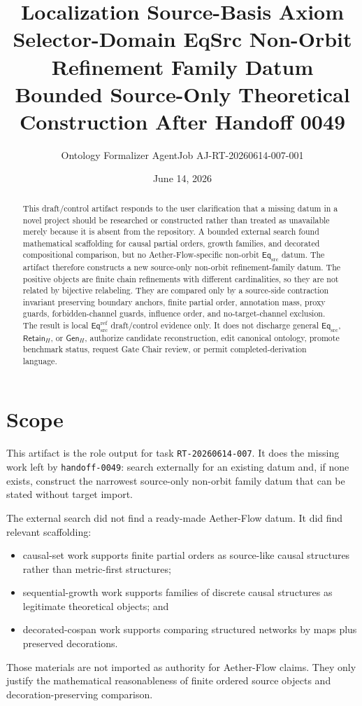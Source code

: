 \documentclass[11pt]{article}
\title{\textbf{Localization Source-Basis Axiom Selector-Domain EqSrc Non-Orbit Refinement Family Datum}\\[0.35em]
\large Bounded Source-Only Theoretical Construction After Handoff 0049}
\author{Ontology Formalizer AgentJob AJ-RT-20260614-007-001}
\date{June 14, 2026}
\newcommand{\EqSrc}{\mathsf{Eq}_{\mathrm{src}}}
\newcommand{\EqRef}{\mathsf{Eq}_{\mathrm{src}}^{\mathrm{ref}}}
\newcommand{\RetainH}{\mathsf{Retain}_{H}}
\newcommand{\GenH}{\mathsf{Gen}_{H}}
\begin{document}
\maketitle

\begin{abstract}
This draft/control artifact responds to the user clarification that a
missing datum in a novel project should be researched or constructed rather
than treated as unavailable merely because it is absent from the repository.
A bounded external search found mathematical scaffolding for causal partial
orders, growth families, and decorated compositional comparison, but no
Aether-Flow-specific non-orbit \(\EqSrc\) datum. The artifact therefore
constructs a new source-only non-orbit refinement-family datum. The positive
objects are finite chain refinements with different cardinalities, so they
are not related by bijective relabeling. They are compared only by a
source-side contraction invariant preserving boundary anchors, finite
partial order, annotation mass, proxy guards, forbidden-channel guards,
influence order, and no-target-channel exclusion. The result is local
\(\EqRef\) draft/control evidence only. It does not discharge general
\(\EqSrc\), \(\RetainH\), or \(\GenH\), authorize candidate reconstruction,
edit canonical ontology, promote benchmark status, request Gate Chair
review, or permit completed-derivation language.
\end{abstract}

\section{Scope}

This artifact is the role output for task \texttt{RT-20260614-007}. It
does the missing work left by \texttt{handoff-0049}: search externally for
an existing datum and, if none exists, construct the narrowest source-only
non-orbit family datum that can be stated without target import.

The external search did not find a ready-made Aether-Flow datum. It did
find relevant scaffolding:
\begin{itemize}
    \item causal-set work supports finite partial orders as source-like
    causal structures rather than metric-first structures;
    \item sequential-growth work supports families of discrete causal
    structures as legitimate theoretical objects; and
    \item decorated-cospan work supports comparing structured networks by
    maps plus preserved decorations.
\end{itemize}
Those materials are not imported as authority for Aether-Flow claims. They
only justify the mathematical reasonableness of finite ordered source
objects and decoration-preserving comparison.
\end{document}
